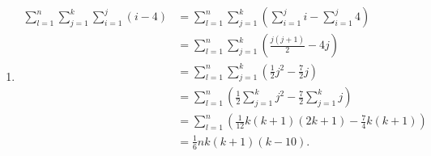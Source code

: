 \documentclass[9pt]{article}
\newcommand{\D}{\displaystyle}
\begin{document}
\begin{enumerate}
\begin{enumerate}
\begin{align*}
                        \frac{6C+2i+1}{2}j\right) \\
                     &= -\frac{5}{2}\sum_{j=1}^mj^2 +
                        \frac{6C+2i+1}{2}\sum_{j=1}^mj \\
                     &= -\frac{5}{12}m(m+1)(2m+1) + \frac{1}{4}m(m+1)(6C+2i+1)\\
                     &= \frac{1}{12} m(m+1)[3(6C + 2i + 1)-5(2m+1)].
               \end{align*}
         \item \begin{align*}
                  \sum_{l=1}^n\sum_{j=1}^k\sum_{i=1}^j (i - 4) &=
                     \sum_{l=1}^n\sum_{j=1}^k\left(\sum_{i=1}^ji -
                     \sum_{i=1}^j4\right) \\
                     &= \sum_{l=1}^n\sum_{j=1}^k\left(\frac{j(j+1)}{2} -
                        4j\right) \\
                     &= \sum_{l=1}^n\sum_{j=1}^k\left(\frac{1}{2}j^2 -
                           \frac{7}{2}j\right) \\
                     &= \sum_{l=1}^n\left(\frac{1}{2}\sum_{j=1}^kj^2 -
                           \frac{7}{2}\sum_{j=1}^kj\right) \\
                     &= \sum_{l=1}^n\left(\frac{1}{12}k(k+1)(2k+1) -
                           \frac{7}{4}k(k+1)\right) \\
                     &= \frac{1}{6} nk(k+1)(k-10).
               \end{align*}
      \end{enumerate}
\begin{comment}
   \item Compute the derivative of

         \begin{enumerate}
            \item $-5x^3 + 2x - 1$.
            \item $3x^4 - 2\sqrt{x} + x^{1/2} - 6x^{-2/3} - 5$.
            \item $x\sqrt{x} + \sqrt{\sqrt{x}}$.
            \item $\log(x) - x^2\ln(x) + \ln(x^4)$.
            \item $\ln^3(x\sqrt{2x - 3}) + \sqrt{\ln(x^2)}$.
            \item $\D\frac{\sqrt{x+5} - \ln(x)}{(x - 1)^3}$.
            \item $\D\frac{\sqrt{x\sqrt{x}\ln^2(3x - 7)}}{\sqrt[8]{5x}}$.
            \item $-\tan(x^4 - 6) + x\sin(x) -
                    \D\frac{\log(x)\cot(x)}{x+2} - 467k$.
         \end{enumerate}
      

\end{comment}
\end{enumerate}
\end{document}
